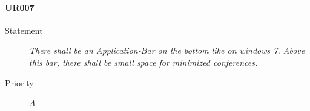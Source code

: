 \paragraph{UR007}
  \begin{description}
  \item [Statement] 
    \textit{ There shall be an Application-Bar on the bottom like on windows 7.
			Above this bar, there shall be small space for minimized conferences.}
  \item [Priority] \textit{A}
\end{description}
